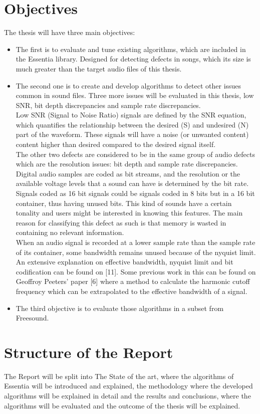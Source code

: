 \section{Objectives}
The thesis will have three main objectives:
\begin{itemize}
\item The first is to evaluate and tune existing algorithms, which are included in the Essentia library. 
Designed for detecting defects in songs, which its size is much greater than the target audio files of this thesis. 
\item The second one is to create and develop algorithms to detect other issues common in sound files. Three more issues will 
be evaluated in this thesis, low SNR, bit depth discrepancies and sample rate discrepancies. \\ Low SNR (Signal to Noise Ratio) 
signals are defined by the SNR equation, which quantifies the relationship between the desired (S) and undesired (N) part of the 
waveform. These signals will have a noise (or unwanted content) content higher than desired compared to the desired signal itself. 
\\ The other two defects are considered to be in the same group of audio defects which are the resolution issues: bit depth and 
sample rate discrepancies. \\ Digital audio samples are coded as bit streams, and the resolution or the available voltage levels 
that a sound can have is determined by the bit rate. Signals coded as 16 bit signals could be signals coded in 8 bits but in a 16 
bit container, thus having unused bits. This kind of sounds have a certain tonality and users might be interested in knowing this 
features. The main reason for classifying this defect as such is that memory is wasted in containing no relevant information.\\ 
When an audio signal is recorded at a lower sample rate than the sample rate of its container, some bandwidth remains unused 
because of the nyquist limit. An extensive explanation on effective bandwidth, nyquist limit and bit codification can be found 
on [11]. Some previous work in this can be found on Geoffroy Peeters’ paper [6] where a method to calculate the harmonic cutoff 
frequency which can be extrapolated to the effective bandwidth of a signal.
\item The third objective is to evaluate those algorithms in a subset from Freesound. 
\end{itemize}

\section{Structure of the Report}

The Report will be split into The State of the art, where the algorithms of Essentia will be introduced and explained, the methodology
where the developed algorithms will be explained in detail and the results and conclusions, where the algorithms will be evaluated and
the outcome of the thesis will be explained.

\newpage


